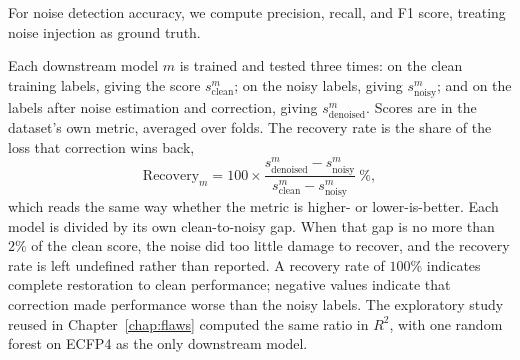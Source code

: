 For noise detection accuracy, we compute precision, recall, and F1 score, treating noise injection as ground truth.

Each downstream model $m$ is trained and tested three times: on the clean training labels, giving the score $s^{m}_{\text{clean}}$; on the noisy labels, giving $s^{m}_{\text{noisy}}$; and on the labels after noise estimation and correction, giving $s^{m}_{\text{denoised}}$. Scores are in the dataset's own metric, averaged over folds. The recovery rate is the share of the loss that correction wins back,
\begin{equation}
\mathrm{Recovery}_m = 100 \times \frac{s^{m}_{\text{denoised}} - s^{m}_{\text{noisy}}}{s^{m}_{\text{clean}} - s^{m}_{\text{noisy}}}\ \%,
\label{eq:recovery}
\end{equation}
which reads the same way whether the metric is higher- or lower-is-better. Each model is divided by its own clean-to-noisy gap. When that gap is no more than $2\%$ of the clean score, the noise did too little damage to recover, and the recovery rate is left undefined rather than reported. A recovery rate of $100\%$ indicates complete restoration to clean performance; negative values indicate that correction made performance worse than the noisy labels. The exploratory study reused in Chapter~\ref{chap:flaws} computed the same ratio in $R^2$, with one random forest on ECFP4 as the only downstream model.
% 
% 


